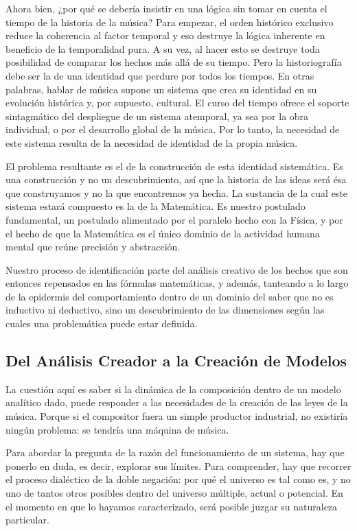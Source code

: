 \documentclass[letterpaper,12pt]{book}
\theoremstyle{definition} \newtheorem{Def}{Definición}[chapter]
\theoremstyle{definition} \newtheorem{Teo}{Teorema}[chapter]
\theoremstyle{definition} \newtheorem{Pro}{Proposición}[chapter]
\theoremstyle{definition} \newtheorem{Lema}{Lema}[chapter]
\begin{document}
 Ahora bien, ¿por qué se debería insistir en una lógica sin tomar en cuenta el tiempo de la historia de la música? Para empezar, el orden histórico exclusivo reduce la coherencia al factor temporal y eso destruye la lógica inherente en beneficio de la temporalidad pura. A su vez, al hacer esto se destruye toda posibilidad de comparar los hechos más allá de su tiempo. Pero la historiografía debe ser la de una identidad que perdure por todos los tiempos. En otras palabras, hablar de música supone un sistema que crea su identidad en su evolución histórica y, por supuesto, cultural. El curso del tiempo ofrece el soporte sintagmático del despliegue de un sistema atemporal, ya sea por la obra individual, o por el desarrollo global de la música. Por lo tanto, la necesidad de este sistema resulta de la necesidad de identidad de la propia música.
 
 El problema resultante es el de la construcción de esta identidad sistemática. Es una construcción y no un descubrimiento, así que la historia de las ideas será ésa que construyamos y no la que encontremos ya hecha. La sustancia de la cual este sistema estará compuesto es la de la Matemática. Es nuestro postulado fundamental, un postulado alimentado por el paralelo hecho con la Física, y por el hecho de que la Matemática es el único dominio de la actividad humana mental que reúne precisión y abstracción.
 
Nuestro proceso de identificación parte del análisis creativo de los hechos que son entonces repensados en las fórmulas matemáticas, y además, tanteando a lo largo de la epidermis del comportamiento dentro de un dominio del saber que no es inductivo ni deductivo, sino un descubrimiento de las dimensiones según las cuales una problemática puede estar definida.

\subsection{Del Análisis Creador a la Creación de Modelos}
 
 La cuestión aquí es saber si la dinámica de la composición dentro de un modelo analítico dado, puede responder a las necesidades de la creación de las leyes de la música. Porque si el compositor fuera un simple productor industrial, no existiría ningún problema: se tendría una máquina de música.
 
 Para abordar la pregunta de la razón del funcionamiento de un sistema, hay que ponerlo en duda, es decir, explorar sus límites. Para comprender, hay que recorrer el proceso dialéctico de la doble negación: por qué el universo es tal como es, y no uno de tantos otros posibles dentro del universo múltiple, actual o potencial. En el momento en que lo hayamos caracterizado, será posible juzgar su naturaleza particular. 
 
\end{document}
